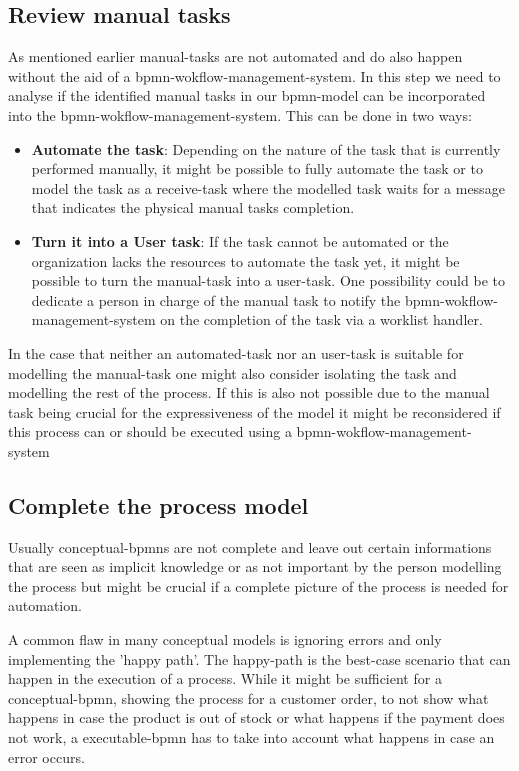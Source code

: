 \subsection{Review manual tasks}\label{manual}
As mentioned earlier \gls{manual-task}s are not automated and do also happen without the aid of a \gls{bpmn-wokflow-management-system}. In this step we need to analyse if the identified manual tasks in our \gls{bpmn}-model can be incorporated into the \gls{bpmn-wokflow-management-system}. This can be done in two ways:
\begin{itemize}
	\item \textbf{Automate the task}: Depending on the nature of the task that is currently performed manually, it might be possible to fully automate the task or to model the task as a \gls{receive-task} where the modelled task waits for a message that indicates the physical manual tasks completion.
	\item \textbf{Turn it into a User task}: If the task cannot be automated or the organization lacks the resources to automate the task yet, it might be possible to turn the \gls{manual-task} into a \gls{user-task}. One possibility could be to dedicate a person in charge of the manual task to notify the \gls{bpmn-wokflow-management-system} on the completion of the task via a worklist handler. \cite{stefanov2014business}
\end{itemize}

In the case that neither an \gls{automated-task} nor an \gls{user-task} is suitable for modelling the \gls{manual-task} one might also consider isolating the task and modelling the rest of the process. If this is also not possible due to the manual task being crucial for the expressiveness of the model it might be reconsidered if this process can or should be executed using a \gls{bpmn-wokflow-management-system}\cite[p.~228]{freund2019real}

\subsection{Complete the process model}
Usually \gls{conceptual-bpmn}s are not complete and leave out certain informations that are seen as implicit knowledge or as not important by the person modelling the process but might be crucial if a complete picture of the process is needed for automation. 

A common flaw in many conceptual models is ignoring errors and only implementing the 'happy path'. The \gls{happy-path} is the best-case scenario that can happen in the execution of a process. While it might be sufficient for a \gls{conceptual-bpmn}, showing the process for a customer order, to not show what happens in case the product is out of stock or what happens if the payment does not work, a \gls{executable-bpmn} has to take into account what happens in case an error occurs. 

